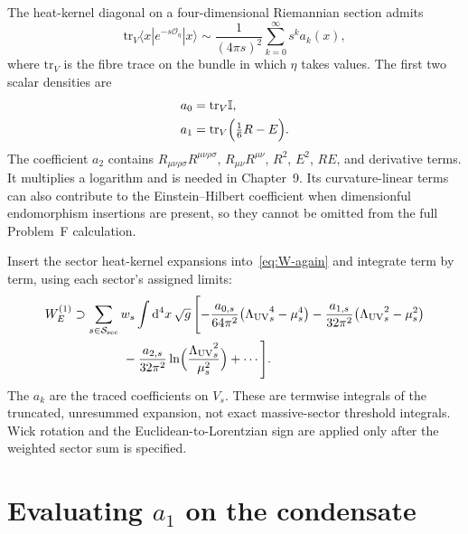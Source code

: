 The heat-kernel diagonal on a four-dimensional Riemannian section
admits
\begin{equation}
  \label{eq:SDW-again}
  \mathrm{tr}_V\langle x|e^{-s\mathcal{O}_\eta}|x\rangle
  \sim
  \frac{1}{(4\pi s)^{2}}
  \sum_{k=0}^{\infty}
  s^k a_k(x),
\end{equation}
where \(\mathrm{tr}_V\) is the fibre trace on the bundle in which
\(\eta\) takes values. The first two scalar densities are
\begin{equation}
  \label{eq:a0a1}
  \begin{aligned}
    a_0&=\mathrm{tr}_V\mathbb{I},\\
    a_1&=\mathrm{tr}_V\Bigl(\tfrac16 R-E\Bigr).
  \end{aligned}
\end{equation}
The coefficient \(a_2\) contains \(R_{\mu\nu\rho\sigma}R^{\mu\nu\rho\sigma}\),
\(R_{\mu\nu}R^{\mu\nu}\), \(R^2\), \(E^2\), \(RE\), and derivative
terms. It multiplies a logarithm and is needed in Chapter~9. Its
curvature-linear terms can also contribute to the Einstein--Hilbert
coefficient when dimensionful endomorphism insertions are present,
so they cannot be omitted from the full Problem~F calculation.

Insert the sector heat-kernel expansions into~\eqref{eq:W-again} and
integrate term by term, using each sector's assigned limits:
\begin{equation}
  \label{eq:W-expand}
  \begin{aligned}
      W_E^{(1)}
    &\supset
      \sum_{s\in\mathcal{S}_{\mathrm{sec}}}w_s
      \int\mathrm{d}^4x\,\sqrt{g}\,
      \Biggl[
        -\frac{a_{0,s}}{64\pi^2}
          \bigl({\Lambda_{\mathrm{UV}}}_s^4-\mu_s^4\bigr)
        -\frac{a_{1,s}}{32\pi^2}
          \bigl({\Lambda_{\mathrm{UV}}}_s^2-\mu_s^2\bigr)\\
      &\qquad\qquad
        -\frac{a_{2,s}}{32\pi^2}
          \ln\Bigl(\frac{{\Lambda_{\mathrm{UV}}}_s^2}{\mu_s^2}\Bigr)
        +\cdots
      \Biggr].
  \end{aligned}
\end{equation}
The \(a_k\) are the traced coefficients on \(V_s\). These are
termwise integrals of the truncated, unresummed expansion, not exact
massive-sector threshold integrals. Wick rotation and the
Euclidean-to-Lorentzian sign are applied only after the weighted
sector sum is specified.

\section{Evaluating \(a_1\) on the condensate}
\label{sec:ch8-a1}

